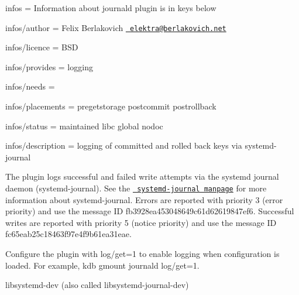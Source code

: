 
\begin{DoxyItemize}
\item infos = Information about journald plugin is in keys below
\item infos/author = Felix Berlakovich \href{mailto:elektra@berlakovich.net}{\texttt{ elektra@berlakovich.\+net}}
\item infos/licence = B\+SD
\item infos/provides = logging
\item infos/needs =
\item infos/placements = pregetstorage postcommit postrollback
\item infos/status = maintained libc global nodoc
\item infos/description = logging of committed and rolled back keys via systemd-\/journal
\end{DoxyItemize}

The plugin logs successful and failed write attempts via the systemd journal daemon (systemd-\/journal). See the \href{http://www.freedesktop.org/software/systemd/man/systemd-journald.service.html}{\texttt{ systemd-\/journal manpage}} for more information about systemd-\/journal. Errors are reported with priority 3 (error priority) and use the message ID {\ttfamily fb3928ea453048649c61d62619847ef6}. Successful writes are reported with priority 5 (notice priority) and use the message ID {\ttfamily fc65eab25c18463f97e4f9b61ea31eae}.

Configure the plugin with {\ttfamily log/get=1} to enable logging when configuration is loaded. For example, {\ttfamily kdb gmount journald log/get=1}.


\begin{DoxyItemize}
\item {\ttfamily libsystemd-\/dev} (also called {\ttfamily libsystemd-\/journal-\/dev}) 
\end{DoxyItemize}